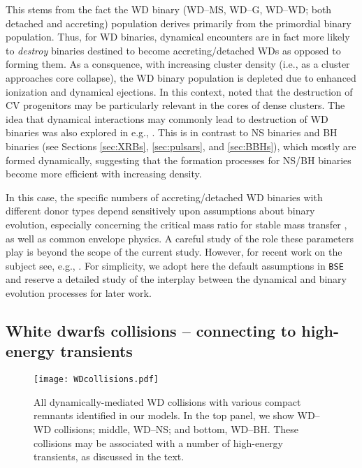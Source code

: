 \documentclass[twocolumn,tighten]{aastex63}
\begin{document}
This stems from the fact the WD binary (WD--MS, WD--G, WD--WD; both detached and accreting) population derives primarily from the primordial binary population. Thus, for WD binaries, dynamical encounters are in fact more likely to \textit{destroy} binaries destined to become accreting/detached WDs as opposed to forming them. As a consquence, with increasing cluster density (i.e., as a cluster approaches core collapse), the WD binary population is depleted due to enhanced ionization and dynamical ejections. In this context, \citet{Davies1997} noted that the destruction of CV progenitors may be particularly relevant in the cores of dense clusters. The idea that dynamical interactions may commonly lead to destruction of WD binaries was also explored in e.g., \citet{Knigge2012}. This is in contrast to NS binaries and BH binaries (see Sections \ref{sec:XRBs}, \ref{sec:pulsars}, and \ref{sec:BBHs}), which mostly are formed dynamically, suggesting that the formation processes for NS/BH binaries become more efficient with increasing density.

In this case, the specific numbers of accreting/detached WD binaries with different donor types depend sensitively upon assumptions about binary evolution, especially concerning the critical mass ratio for stable mass transfer \citep[for example, see][]{Hurley2002}, as well as common envelope physics. A careful study of the role these parameters play is beyond the scope of the current study. However, for recent work on the subject see, e.g., \citet{Belloni2017}. For simplicity, we adopt here the default assumptions in \texttt{BSE} and reserve a detailed study of the interplay between the dynamical and binary evolution processes for later work.



\subsection{White dwarfs collisions -- connecting to high-energy transients}
\label{sec:WDcollisions}

\begin{figure}
\begin{center}
\texttt{[image: WDcollisions.pdf]}
\caption{\footnotesize \label{fig:WDcollisions} All dynamically-mediated WD collisions with various compact remnants identified in our models. In the top panel, we show WD--WD collisions; middle, WD--NS; and bottom, WD--BH. These collisions may be associated with a number of high-energy transients, as discussed in the text.}
\end{center}
\end{figure}
\end{document}
